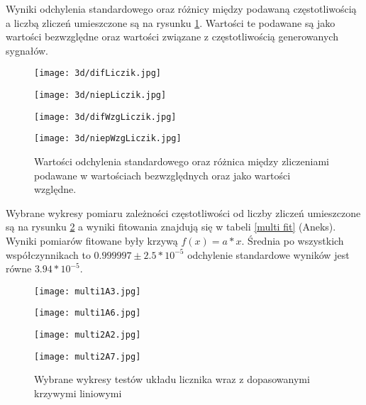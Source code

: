 Wyniki odchylenia standardowego oraz różnicy między podawaną częstotliwością a liczbą zliczeń umieszczone są na rysunku \ref{3d licznik}. Wartości te podawane są jako wartości bezwzględne oraz wartości związane z częstotliwością generowanych sygnałów.

\begin{figure}
        \centering
        \begin{multicols}{2}
                \texttt{[image: 3d/difLiczik.jpg]} \par                
                \texttt{[image: 3d/niepLiczik.jpg]} \par                
        \end{multicols} \hfill
        \begin{multicols}{2}
                \texttt{[image: 3d/difWzgLiczik.jpg]} \par                
                \texttt{[image: 3d/niepWzgLiczik.jpg]} \par                
        \end{multicols}
        \caption{Wartości odchylenia standardowego oraz różnica między zliczeniami podawane w wartościach bezwzględnych oraz jako wartości względne. }
        \label{3d licznik}
\end{figure}

Wybrane wykresy pomiaru zależności częstotliwości od liczby zliczeń umieszczone są na rysunku \ref{multi wyk} a wyniki fitowania znajdują się w tabeli \ref{multi fit} (Aneks). Wyniki pomiarów fitowane były krzywą $f(x) = a*x$. 
Średnia po wszystkich współczynnikach to $0.999997 \pm 2.5*10^{-5}$
odchylenie standardowe wyników jest równe  $3.94 * 10^{-5}$.

\begin{figure}
        \centering
        \begin{multicols}{2}
                \texttt{[image: multi1A3.jpg]} \par
                \texttt{[image: multi1A6.jpg]} \par                
        \end{multicols} \hfill
        \begin{multicols}{2}
                \texttt{[image: multi2A2.jpg]} \par
                \texttt{[image: multi2A7.jpg]} \par                
        \end{multicols}
        \caption{Wybrane wykresy testów układu licznika wraz z dopasowanymi krzywymi liniowymi}
        \label{multi wyk}
\end{figure}




